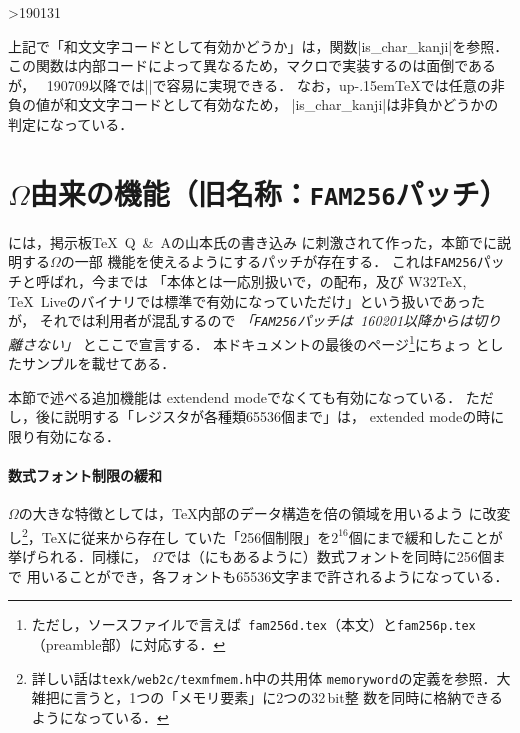\documentclass[a4paper,11pt,nomag]{jsarticle}
\newcommand{\OMEGA}{$\Omega$}
\def\upTeX{u\pTeX}\def\pTeX{p\kern-.15em\TeX}
\begin{document}
\ifnum\epTeXversion>190131 %
\begin{dangerous}
  上記で「和文文字コードとして有効かどうか」は，関数|is_char_kanji|を参照．
  この関数は内部コードによって異なるため，マクロで実装するのは面倒であるが，
  \epTeX~190709以降では|\iffontchar|で容易に実現できる．
  なお，\upTeX では任意の非負の値が和文文字コードとして有効なため，
  |is_char_kanji|は非負かどうかの判定になっている．
\end{dangerous}
\fi %

\section{\OMEGA 由来の機能（旧名称：\texttt{FAM256}パッチ）}
\epTeX には，掲示板\TeX\ Q\ \&\ Aの山本氏の書き込み
\cite{yamamoto}に刺激されて作った，本節でに説明する\OMEGA の一部
機能を使えるようにするパッチが存在する．
これは\texttt{FAM256}パッチと呼ばれ，今までは
「\epTeX 本体とは一応別扱いで，\epTeX の配布，及び
W32\TeX, \TeX~Liveのバイナリでは標準で有効になっていただけ」という扱いであったが，
それでは利用者が混乱するので
\emph{「\texttt{FAM256}パッチは\epTeX~160201以降からは切り離さない」}
とここで宣言する．
本ドキュメントの最後のページ\footnote{ただし，ソースファイルで言えば{\tt
fam256d.tex}（本文）と\texttt{fam256p.tex}（preamble部）に対応する．}にちょっ
としたサンプルを載せてある．

本節で述べる追加機能は extendend modeでなくても有効になっている．
ただし，後に説明する「レジスタが各種類65536個まで」は，
extended modeの時に限り有効になる．

\paragraph{数式フォント制限の緩和}
\OMEGA の大きな特徴としては，\TeX 内部のデータ構造を倍の領域を用いるよう
に改変し\footnote{詳しい話は\texttt{texk/web2c/texmfmem.h}中の共用体%
\texttt{memoryword}の定義を参照．大雑把に言うと，1つの「メモリ要素」に2つの32\,bit整
数を同時に格納できるようになっている．}，\TeX に従来から存在し
ていた「256個制限」を$2^{16}$個にまで緩和したことが挙げられる．同様に，
\OMEGA では（\cite{yamamoto}にもあるように）数式フォントを同時に256個まで
用いることができ，各フォントも65536文字まで許されるようになっている．

\medskip
\end{document}
